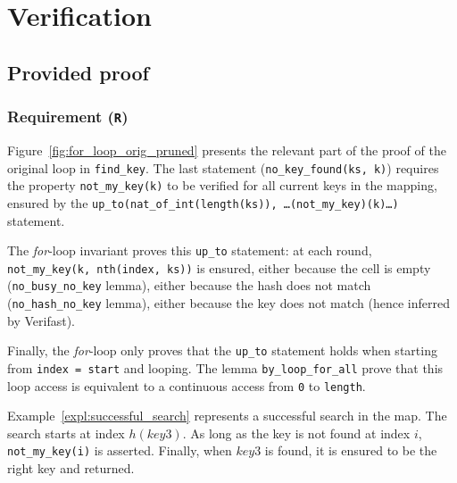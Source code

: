 \documentclass[oneside]{article}
\begin{document}
\section{Verification}

\subsection{Provided proof}
\subsubsection{Requirement (\texttt{R})}
Figure~\ref{fig:for_loop_orig_pruned} presents the relevant part of the proof of the original loop in \texttt{find\_key}. The last statement (\texttt{no\_key\_found(ks, k)}) requires the property \texttt{not\_my\_key(k)} to be verified for all current keys in the mapping, ensured by the \texttt{up\_to(nat\_of\_int(length(ks)), \ldots(not\_my\_key)(k)\ldots)} statement.

The \emph{for}-loop invariant proves this \texttt{up\_to} statement: at each round, \texttt{not\_my\_key(k, nth(index, ks))} is ensured, either because the cell is empty (\texttt{no\_busy\_no\_key} lemma), either because the hash does not match (\texttt{no\_hash\_no\_key} lemma), either because the key does not match (hence inferred by Verifast). 

Finally, the \emph{for}-loop only proves that the \texttt{up\_to} statement holds when starting from \texttt{index = start} and looping. The lemma \texttt{by\_loop\_for\_all} prove that this loop access is equivalent to a continuous access from \texttt{0} to \texttt{length}.

Example~\ref{expl:successful_search} represents a successful search in the map. The search starts at index $h(key3)$. As long as the key is not found at index $i$, \texttt{not\_my\_key(i)} is asserted. Finally, when $key3$ is found, it is ensured to be the right key and returned. 
\end{document}
